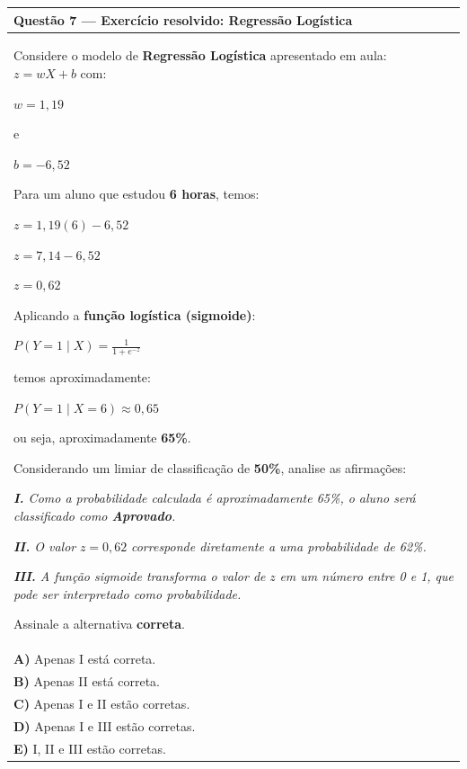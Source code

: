 \documentclass[
]{book}
\begin{document}
\begin{longtable}[]{@{}
  >{\raggedright\arraybackslash}p{}@{}}
\toprule\noalign{}
\begin{minipage}[b]{\linewidth}\raggedright
\textbf{Questão 7 --- Exercício resolvido: Regressão Logística}
\end{minipage} \\
\midrule\noalign{}
\endhead
\bottomrule\noalign{}
\endlastfoot
Considere o modelo de \textbf{Regressão Logística} apresentado em aula: \(\displaystyle z = wX + b\) com:

\(\displaystyle w = 1{,}19\)

e

\(\displaystyle b = -6{,}52\)

Para um aluno que estudou \textbf{6 horas}, temos:

\(\displaystyle z = 1{,}19(6) - 6{,}52\)

\(\displaystyle z = 7{,}14 - 6{,}52\)

\(\displaystyle z = 0{,}62\)

Aplicando a \textbf{função logística (sigmoide)}:

\(\displaystyle P(Y=1 \mid X) = \frac{1}{1+e^{-z}}\)

temos aproximadamente:

\(\displaystyle P(Y=1 \mid X=6) \approx 0{,}65\)

ou seja, aproximadamente \textbf{65\%}.

Considerando um limiar de classificação de \textbf{50\%}, analise as afirmações:

\emph{\textbf{I.} Como a probabilidade calculada é aproximadamente 65\%, o aluno será classificado como \textbf{Aprovado}.}

\emph{\textbf{II.} O valor} \(z=0{,}62\) \emph{corresponde diretamente a uma probabilidade de 62\%.}

\emph{\textbf{III.} A função sigmoide transforma o valor de} \(z\) \emph{em um número entre 0 e 1, que pode ser interpretado como probabilidade.}

Assinale a alternativa \textbf{correta}. \\
\textbf{A)} Apenas I está correta. \\
\textbf{B)} Apenas II está correta. \\
\textbf{C)} Apenas I e II estão corretas. \\
\textbf{D)} Apenas I e III estão corretas. \\
\textbf{E)} I, II e III estão corretas. \\
\end{longtable}
\end{document}
